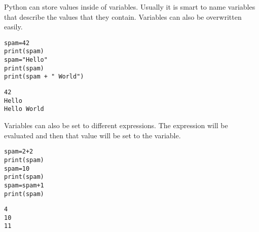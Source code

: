 \documentclass[11pt]{article}
\begin{document}
Python can store values inside of variables. Usually it is smart to name variables that describe the values that they contain. Variables can also be overwritten easily.

\begin{verbatim}
spam=42
print(spam)
spam="Hello"
print(spam)
print(spam + " World")
\end{verbatim}

\begin{verbatim}
42
Hello
Hello World
\end{verbatim}


Variables can also be set to different expressions. The expression will be evaluated and then that value will be set to the variable.

\begin{verbatim}
spam=2+2
print(spam)
spam=10
print(spam)
spam=spam+1
print(spam)
\end{verbatim}

\begin{verbatim}
4
10
11
\end{verbatim}
\end{document}
